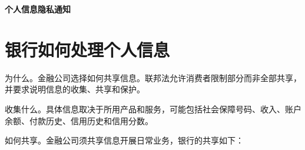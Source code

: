 \documentclass[UTF8,fontset=none,11pt,a4paper]{ctexart}
\begin{document}
{\noindent\fontsize{20}{25}\selectfont\bfseries 个人信息隐私通知\par}
\vspace{10pt}
\section*{银行如何处理个人信息}
为什么。金融公司选择如何共享信息。联邦法允许消费者限制部分而非全部共享，并要求说明信息的收集、共\allowbreak\mbox{享和保护。}


收集什么。具体信息取决于所用产品和服务，可能包括社会保障号码、收入、账户余额、付款历史、信用历史和\allowbreak\mbox{信用分数。}


如何共享。金融公司须共享信息开展日常业务，银行的\allowbreak\mbox{共享如下：}
\end{document}
